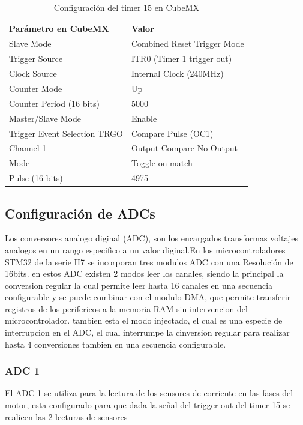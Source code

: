 \documentclass[11pt]{report}
\begin{document}
\begin{table}[h!]
	\centering
	\begin{tabular}{| l | l |}
		\hline
		\textbf{Parámetro en CubeMX} & \textbf{Valor}              \\
		\hline
		Slave Mode                   & Combined Reset Trigger Mode \\
		Trigger Source               & ITR0 (Timer 1 trigger out)  \\
		Clock Source                 & Internal Clock (240MHz)     \\
		Counter Mode                 & Up                          \\
		Counter Period (16 bits)     & 5000                        \\
		Master/Slave Mode            & Enable                      \\
		Trigger Event Selection TRGO & Compare Pulse (OC1)         \\
		\hline
		Channel 1                    & Output Compare No Output    \\
		Mode                         & Toggle on match             \\
		Pulse (16 bits)              & 4975                        \\
		\hline
	\end{tabular}
	\caption{Configuración del timer 15 en CubeMX}
	\label{TIM15_config}
\end{table}
\FloatBarrier

\subsection{Configuración de ADCs}

Los conversores analogo diginal (ADC), son los encargados transformas voltajes analogos en un rango especifico a un valor diginal.En los microcontroladores STM32 de la serie H7 se incorporan tres modulos ADC con una Resolución de 16bits. en estos ADC existen 2 modos leer los canales, siendo la principal la conversion regular la cual permite leer hasta 16 canales en una secuencia configurable y se puede combinar con el modulo DMA, que permite transferir registros de los perifericos a la memoria RAM sin intervencion del microcontrolador. tambien esta el modo injectado, el cual es una especie de interrupcion en el ADC, el cual interrumpe la cinversion regular para realizar hasta 4 conversiones tambien en una secuencia configurable.

\subsubsection{ADC 1}
El ADC 1 se utiliza para la lectura de los sensores de corriente en las fases del motor, esta configurado para que dada la señal del trigger out del timer 15 se realicen las 2 lecturas de sensores
\end{document}
